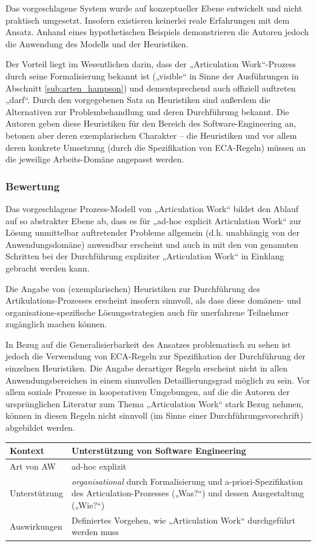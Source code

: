 Das vorgeschlagene System wurde auf konzeptueller Ebene entwickelt und nicht praktisch umgesetzt. Insofern existieren keinerlei reale Erfahrungen mit dem Ansatz. Anhand eines hypothetischen Beispiels demonstrieren die Autoren jedoch die Anwendung des Modells und der Heuristiken.

Der Vorteil liegt im Wesentlichen darin, dass der „Articulation Work“-Prozess durch seine Formalisierung bekannt ist („visible“ in Sinne der Ausführungen in Abschnitt \ref{sub:arten_hampson}) und dementsprechend auch offiziell auftreten „darf“. Durch den vorgegebenen Satz an Heuristiken sind außerdem die Alternativen zur Problembehandlung und deren Durchführung bekannt. Die Autoren geben diese Heuristiken für den Bereich des Software-Engineering an, betonen aber deren exemplarischen Charakter -- die Heuristiken und vor allem deren konkrete Umsetzung (durch die Spezifikation von \gls{ECA}-Regeln) müssen an die jeweilige Arbeits-Domäne angepasst werden. 

\subsubsection{Bewertung}

Das vorgeschlagene Prozess-Modell von „Articulation Work“ bildet den Ablauf auf so abstrakter Ebene ab, dass es für „ad-hoc explicit Articulation Work“ zur Lösung unmittelbar auftretender Probleme allgemein (d.h. unabhängig von der Anwendungsdomäne) anwendbar erscheint und auch in mit den von \cite{Corbin93} genannten Schritten bei der Durchführung expliziter „Articulation Work“ in Einklang gebracht werden kann.

Die Angabe von (exemplarischen) Heuristiken zur Durchführung des Artikulations-Prozesses erscheint insofern sinnvoll, als dass diese domänen- und organisations-spezifische Lösungsstrategien auch für unerfahrene Teilnehmer zugänglich machen können.

In Bezug auf die Generalisierbarkeit des Ansatzes problematisch zu sehen ist jedoch die Verwendung von \gls{ECA}-Regeln zur Spezifikation der Durchführung der einzelnen Heuristiken. Die Angabe derartiger Regeln erscheint nicht in allen Anwendungsbereichen in einem sinnvollen Detaillierungsgrad möglich zu sein. Vor allem soziale Prozesse in kooperativen Umgebungen, auf die die Autoren der ursprünglichen Literatur zum Thema „Articulation Work“ stark Bezug nehmen, können in diesen Regeln nicht sinnvoll (im Sinne einer Durchführungsvorschrift) abgebildet werden.
\\[1em]
\begin{tabular}{| p{3cm} | p{10cm} |}
  \hline
  Kontext & Unterstützung von Software Engineering \\ \hline
  Art von AW & ad-hoc explizit \\ \hline
  Unterstützung & \emph{organisational} durch Formalisierung und a-priori-Spezifikation des Articulation-Prozesses („Was?“) und dessen Ausgestaltung („Wie?“) \\ \hline
  Auswirkungen & Definiertes Vorgehen, wie „Articulation Work“ durchgeführt werden muss \\ \hline
\end{tabular}

